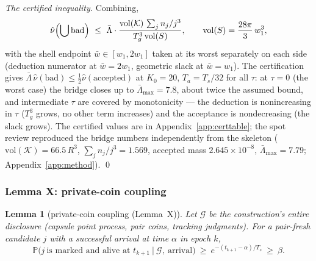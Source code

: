 \documentclass[11pt]{article}
\newtheorem{lemma}{Lemma}
\newcommand{\PP}{\mathbb{P}}
\newcommand{\Ts}{T_s}
\newcommand{\Ta}{T_a}
\newcommand{\Tg}{T_g}
\newcommand{\relL}{\bar\Lambda}
\newcommand{\wbar}{\bar w}
\begin{document}
\emph{The certified inequality.} Combining,
\[
  \hat\nu\Bigl(\bigcup\mathrm{bad}\Bigr)\ \le\ \relL\cdot
  \frac{\mathrm{vol}(\mathcal{K})\,\sum_jn_j/j^3}{\Tg^3\,\mathrm{vol}(S)},
  \qquad \mathrm{vol}(S)=\frac{28\pi}{3}\,w_1^3,
\]
with the shell endpoint $\wbar\in[w_1,2w_1]$ taken at its worst separately
on each side (deduction numerator at $\wbar=2w_1$, geometric slack at
$\wbar=w_1$). The certification gives
$\relL\,\hat\nu(\mathrm{bad})\le\frac12\hat\nu(\mathrm{accepted})$ at
$K_0=20$, $\Ta=\Ts/32$ for all $\tau$: at $\tau=0$ (the worst case) the
bridge closes up to $\relL_{\max}=7.8$, about twice the assumed bound, and
intermediate $\tau$ are covered by monotonicity --- the deduction is
nonincreasing in $\tau$ ($\Tg^3$ grows, no other term increases) and the
acceptance is nondecreasing (the slack grows). The certified values are in
Appendix~\ref{app:certtable}; the spot review reproduced the bridge numbers
independently from the skeleton
($\mathrm{vol}(\mathcal{K})=66.5\,R^3$, $\sum_jn_j/j^3=1.569$, accepted
mass $2.645\times10^{-8}$, $\relL_{\max}=7.79$;
Appendix~\ref{app:method}). \qed

\subsubsection{Lemma X: private-coin coupling}\label{app:c2X}

\begin{lemma}[private-coin coupling (Lemma~X)]\label{lem:X}
Let $\mathcal G$ be the construction's entire disclosure (capsule point
process, pair coins, tracking judgments). For a pair-fresh candidate $j$
with a successful arrival at time $\alpha$ in epoch $k$,
\[
  \PP\bigl(j\ \text{is marked and alive at }t_{k+1}\ \big|\
  \mathcal G,\ \text{arrival}\bigr)\ \ge\ e^{-(t_{k+1}-\alpha)/\Ts}\ \ge\
  \beta .
\]
\end{lemma}
\end{document}
